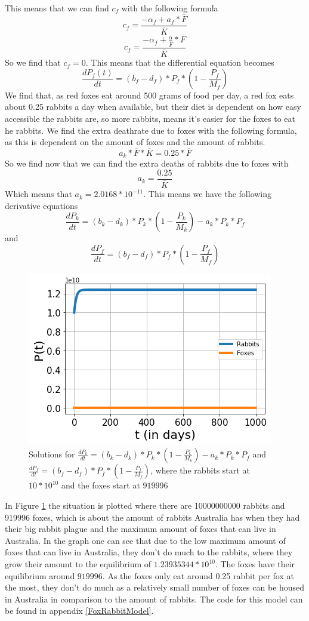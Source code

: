 \documentclass{article}
\begin{document}
This means that we can find $c_f$ with the following formula
$$c_f=\frac{-\alpha_f+a_f*\overline{F}}{\overline{K}}$$
$$c_f=\frac{-\alpha_f+\frac{\alpha}{\overline{F}}*\overline{F}}{\overline{K}}$$
So we find that $c_f=0$. This means that the differential equation becomes 
$$\frac{dP_f(t)}{dt}=(b_f-d_f)*P_f*(1-\frac{P_f}{M_f})$$
We find that, as red foxes eat around 500 grams of food per day, a red fox eats about 0.25 rabbits a day when available, but their diet is dependent on how easy accessible the rabbits are, so more rabbits, means it's easier for the foxes to eat he rabbits.\cite{FoxFood} We find the extra deathrate due to foxes with the following formula, as this is dependent on the amount of foxes and the amount of rabbits.
$$a_k*\overline{F}*\overline{K}=0.25*\overline{F}$$
So we find now that we can find the extra deaths of rabbits due to foxes with
$$a_k=\frac{0.25}{\overline{K}}$$
Which means that $a_k=2.0168*10^{-11}$. This means we have the following derivative equations
$$\frac{dP_k}{dt}=(b_k-d_k)*P_k*(1-\frac{P_k}{M_k})-a_k*P_k*P_f$$
and
$$\frac{dP_f}{dt}=(b_f-d_f)*P_f*(1-\frac{P_f}{M_f})$$
\begin{figure}[ht!]
    \centering
    \includegraphics[scale=0.78]{Pictures/RabbitFoxes.png}
    \caption{Solutions for $\frac{dP_k}{dt}=(b_k-d_k)*P_k*(1-\frac{P_k}{M_k})-a_k*P_k*P_f$ and $\frac{dP_f}{dt}=(b_f-d_f)*P_f*(1-\frac{P_f}{M_f})$, where the rabbits start at $10*10^{10}$ and the foxes start at $919996$}
    \label{fig:RabbitFoxes}
\end{figure}
In Figure \ref{fig:RabbitFoxes} the situation is plotted where there are 10000000000 rabbits and 919996 foxes, which is about the amount of rabbits Australia has when they had their big rabbit plague and the maximum amount of foxes that can live in Australia. In the graph one can see that due to the low maximum amount of foxes that can live in Australia, they don't do much to the rabbits, where they grow their amount to the equilibrium of $1.23935344*10^10$. The foxes have their equilibrium around $919996$. As the foxes only eat around 0.25 rabbit per fox at the most, they don't do much as a relatively small number of foxes can be housed in Australia in comparison to the amount of rabbits. The code for this model can be found in appendix \ref{FoxRabbitModel}.
\end{document}
